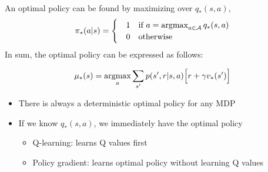 An optimal policy can be found by maximizing over $q_*(s,a)$, 
\begin{align*}
	\pi_*(a|s) = 
	\begin{cases} 
		&1 \quad \textrm{if } a = \operatorname*{\operatorname{argmax}}_{a\in \mathcal{A}}q_*(s,a)\\
		&0 \quad \textrm{otherwise}
	\end{cases}
\end{align*}
In sum, the optimal policy can be expressed as follows:

\begin{align*}
	\mu_*(s) = \operatorname*{\operatorname{argmax}}_a \sum_{s'}p(s',r|s,a)\Big[r + \gamma  v_*(s')\Big] 
\end{align*}



\begin{itemize}
	\item There is always a deterministic optimal policy for any MDP
	\item If we know $q_*(s,a)$, we immediately have the optimal policy 
		\begin{itemize}
			\item Q-learning: learns Q values first
			\item Policy gradient: learns optimal policy without learning Q values
		\end{itemize}
\end{itemize}

